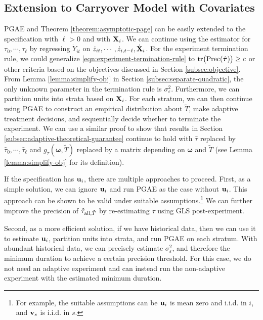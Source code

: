 \subsection{Extension to Carryover Model with Covariates}\label{subsec:sequential-carryover}

PGAE and Theorem \ref{theorem:asymptotic-page} can be easily extended to the specification with $\ell > 0$ and with $\mathbf{X}_i$. We can continue using the \within estimator for $\tau_0, \cdots, \tau_\ell$ by regressing $\dot{Y}_{it}$ on $\dot{z}_{it}, \cdots, \dot{z}_{i,t-\ell}, \dot{\mathbf{X}}_i$. For the experiment termination rule, we could generalize \eqref{eqn:experiment-termination-rule} to $\mathrm{tr} \big(\mathrm{Prec}(\hat{\bm{\tau}})  \big) \geq c$ or other criteria based on the objectives discussed in Section \ref{subsec:objective}. From Lemma \ref{lemma:simplify-obj} in Section \ref{subsec:separate-quadratic}, the only unknown parameter in the termination rule is $\sigma_\varepsilon^2$. Furthermore, we can partition units into strata based on $\mathbf{X}_i$. For each stratum, we can then continue using PGAE to construct an empirical distribution about $\tilde{T}$, make adaptive treatment decisions, and sequentially decide whether to terminate the experiment. We can use a similar proof to show that results in Section \ref{subsec:adaptive-theoretical-guarantee} continue to hold with $\hat\tau$ replaced by $\hat\tau_0, \cdots, \hat\tau_\ell$ and $g_{\tau}(\bm{\omega},\tilde{T}) $ replaced by a matrix depending on $\bm{\omega}$ and $\tilde{T}$ (see Lemma \ref{lemma:simplify-obj} for its definition). 


{\blue If the specification has $\mathbf{u}_i$, there are multiple approaches to proceed. First, as a simple solution, we can ignore $\mathbf{u}_i$ and run PGAE as the case without $\mathbf{u}_i$. This approach can be shown to be valid under suitable assumptions.\footnote{For example, the suitable assumptions can be $\mathbf{u}_i$ is mean zero and i.i.d. in $i$, and $\mathbf{v}_s$ is i.i.d. in $s$.} We can further improve the precision of $\hat{\tau}_{\mathrm{all},\tilde{T}}$ by re-estimating $\tau$ using GLS post-experiment.

Second, as a more efficient solution, if we have historical data, then we can use it to estimate $\mathbf{u}_i$, partition units into strata, and run PGAE on each stratum. With abundant historical data, we can precisely estimate $\sigma_\varepsilon^2$, and therefore the minimum duration to achieve a certain precision threshold. For this case, we do not need an adaptive experiment and can instead run the non-adaptive experiment with the estimated minimum duration.}